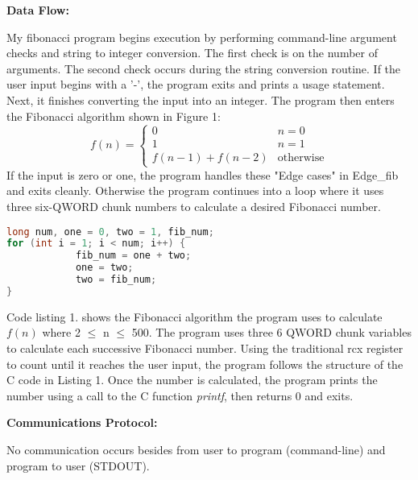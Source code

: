 \documentclass{article}
\begin{document}
\begin{flushleft}
\textbf{Data Flow:}
\vspace{.5pc}
\end{flushleft}

My fibonacci program begins execution by performing command-line argument 
checks and string to integer conversion.  The first check is on the number of 
arguments.  The second check occurs during the string conversion routine.  If 
the user input begins with a '-', the program exits and prints a usage 
statement.  Next, it finishes converting the input into an integer. The 
program then enters the Fibonacci algorithm shown in Figure 1:
\begin{equation}
    f(n) = \begin{cases}
               0               & n = 0\\
               1               & n = 1\\
               f(n-1) + f(n-2) & \text{otherwise}
           \end{cases}
\end{equation}
If the input is zero or one, the program handles these "Edge cases" in
Edge\_fib and exits cleanly.  Otherwise the program continues into a loop 
where it uses three six-QWORD chunk numbers to calculate a desired Fibonacci
number.

\begin{lstlisting}[language=C, caption=Fibonacci in C]
long num, one = 0, two = 1, fib_num;
for (int i = 1; i < num; i++) {
            fib_num = one + two;
            one = two;
            two = fib_num;
}
\end{lstlisting}
Code listing 1. shows the Fibonacci algorithm the program uses to calculate 
$f(n)$ where 2 $\leq$ n $\leq$ 500.  The program uses three 6 QWORD chunk 
variables to calculate each successive Fibonacci number.  Using the 
traditional rcx register to count until it reaches the user input, the program
follows the structure of the C code in Listing 1.  Once the number is 
calculated, the program prints the number using a call to the C function 
\textit{printf}, then returns 0 and exits. 
\vspace{.5pc}

\begin{flushleft}
\textbf{Communications Protocol:}
\vspace{.5pc}
\end{flushleft}
No communication occurs besides from user to program (command-line) and 
program to user (STDOUT).
\vspace{.5pc}
\end{document}
